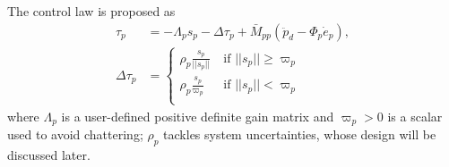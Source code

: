 \documentclass[letterpaper, 10 pt, conference]{ieeeconf}  %
\begin{document}
The control law is proposed as
\begin{subequations}\label{ct1}
\begin{align}
\tau_{p} &= -\Lambda_{p} s_p - \Delta \tau_{p} + \bar{M}_{pp}(\ddot{p}_d- \Phi_{p} {\dot{e}_p}),  \label{tau_p}\\
\Delta \tau_{p} &= \begin{cases}
    \rho_{p} \frac{s_{p}}{||s_{p}||}       & ~ \text{if } || s_{p}|| \geq \varpi_p\\
    \label{del_p}
    \rho_{p} \frac{s_{p}}{\varpi_p}       & ~ \text{if } || s_{p}|| < \varpi_p\\
    \end{cases}
\end{align}
\end{subequations}
where $\Lambda_{p}$ is a user-defined positive definite gain matrix and $\varpi_{p} > 0$ is a scalar used to avoid chattering; $\rho_{p}$ tackles system uncertainties, whose design will be discussed later.



 
\end{document}
